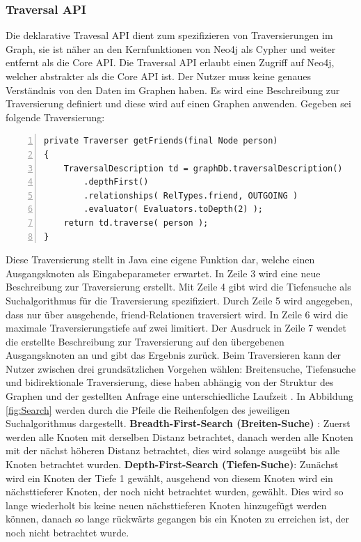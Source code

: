 \subsubsection{Traversal API}
Die deklarative Travesal API dient zum spezifizieren von Traversierungen im Graph, sie ist näher an den Kernfunktionen von Neo4j als Cypher und weiter entfernt als die Core API. Die Traversal API erlaubt einen Zugriff auf Neo4j, welcher  abstrakter als die Core API ist. Der Nutzer muss keine genaues Verständnis von den Daten im Graphen haben. Es wird eine Beschreibung zur Traversierung  definiert und diese wird auf einen Graphen anwenden. Gegeben sei folgende Traversierung:
\begin{Verbatim}[numbers=left,xleftmargin=5mm,frame=single]
private Traverser getFriends(final Node person)
{
	TraversalDescription td = graphDb.traversalDescription()
		.depthFirst()
		.relationships( RelTypes.friend, OUTGOING )
		.evaluator( Evaluators.toDepth(2) );
	return td.traverse( person );
}
\end{Verbatim}
Diese Traversierung stellt in Java eine eigene Funktion dar, welche einen Ausgangsknoten als Eingabeparameter erwartet. In Zeile 3 wird eine neue Beschreibung zur Traversierung erstellt. Mit Zeile 4 gibt wird die Tiefensuche als Suchalgorithmus für die Traversierung spezifiziert. Durch Zeile 5 wird angegeben, dass nur über ausgehende, friend-Relationen traversiert wird. In Zeile 6  wird die maximale Traversierungstiefe auf zwei limitiert. Der Ausdruck in Zeile 7 wendet die erstellte Beschreibung zur Traversierung auf den übergebenen Ausgangsknoten an und gibt das Ergebnis zurück. \newline
Beim Traversieren kann der  Nutzer zwischen drei grundsätzlichen Vorgehen wählen: Breitensuche, Tiefensuche und bidirektionale Traversierung, diese haben abhängig von der Struktur des Graphen und der gestellten Anfrage eine unterschiedliche Laufzeit \parencite{vukotic2015neo4j}. In  Abbildung \ref{fig:Search} werden durch die Pfeile die Reihenfolgen des jeweiligen Suchalgorithmus dargestellt. \newline
\textbf {Breadth-First-Search (Breiten-Suche)} : Zuerst werden alle Knoten mit derselben Distanz betrachtet, danach werden alle Knoten mit der nächst höheren Distanz betrachtet, dies wird solange ausgeübt bis alle Knoten betrachtet wurden. \newline
\textbf {Depth-First-Search (Tiefen-Suche)}: Zunächst wird ein Knoten der Tiefe 1 gewählt, ausgehend von diesem Knoten wird ein nächsttieferer Knoten, der noch nicht betrachtet wurden, gewählt. Dies wird so lange wiederholt bis keine neuen nächsttieferen Knoten hinzugefügt werden können, danach so lange rückwärts gegangen bis ein Knoten zu erreichen ist, der noch nicht betrachtet wurde. \newline
